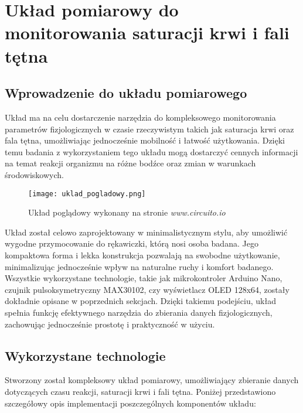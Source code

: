 \chapter{Układ pomiarowy do monitorowania saturacji krwi i fali tętna}
\section{Wprowadzenie do układu pomiarowego}
Układ ma na celu dostarczenie narzędzia do kompleksowego monitorowania parametrów fizjologicznych w czasie rzeczywistym takich jak saturacja krwi oraz fala tętna, umożliwiając jednocześnie mobilność i łatwość użytkowania. Dzięki temu badania z wykorzystaniem tego układu mogą dostarczyć cennych informacji na temat reakcji organizmu na różne bodźce oraz zmian w warunkach środowiskowych.
\begin{figure}[!htb]
    \centering
    \texttt{[image: uklad\_pogladowy.png]}
    \caption{Układ poglądowy wykonany na stronie \textit{www.circuito.io}}
\end{figure}

Układ został celowo zaprojektowany w minimalistycznym stylu, aby umożliwić wygodne przymocowanie do rękawiczki, którą nosi osoba badana. Jego kompaktowa forma i lekka konstrukcja pozwalają na swobodne użytkowanie, minimalizując jednocześnie wpływ na naturalne ruchy i komfort badanego. Wszystkie wykorzystane technologie, takie jak mikrokontroler Arduino Nano, czujnik pulsoksymetryczny MAX30102, czy wyświetlacz OLED 128x64, zostały dokładnie opisane w poprzednich sekcjach. Dzięki takiemu podejściu, układ spełnia funkcję efektywnego narzędzia do zbierania danych fizjologicznych, zachowując jednocześnie prostotę i praktyczność w użyciu.

\section{Wykorzystane technologie}
Stworzony został kompleksowy układ pomiarowy, umożliwiający zbieranie danych dotyczących czasu reakcji, saturacji krwi i fali tętna. Poniżej przedstawiono szczegółowy opis implementacji poszczególnych komponentów układu:
